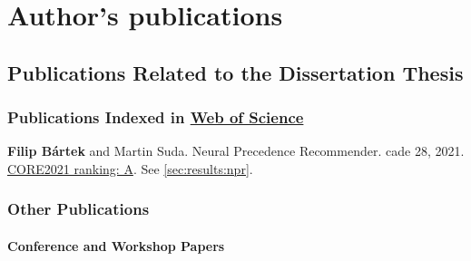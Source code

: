 \chapter{Author's publications}



\newcommand{\auth}\textbf
\newcommand{\core}[3]{\href{https://portal.core.edu.au/conf-ranks/#3/}{CORE#1 ranking: #2}}


\section{Publications Related to the Dissertation Thesis}

\subsection{Publications Indexed in \href{https://www.webofscience.com/}{Web of Science}}

\auth{Filip Bártek} and Martin Suda.
Neural Precedence Recommender.
\Gls{cade} 28, 2021.
\cite{DBLP:conf/cade/Bartek021}
\\
\core{2021}{A}{918}. See \cref{sec:results:npr}.

\subsection{Other Publications}

\subsubsection{Conference and Workshop Papers}

